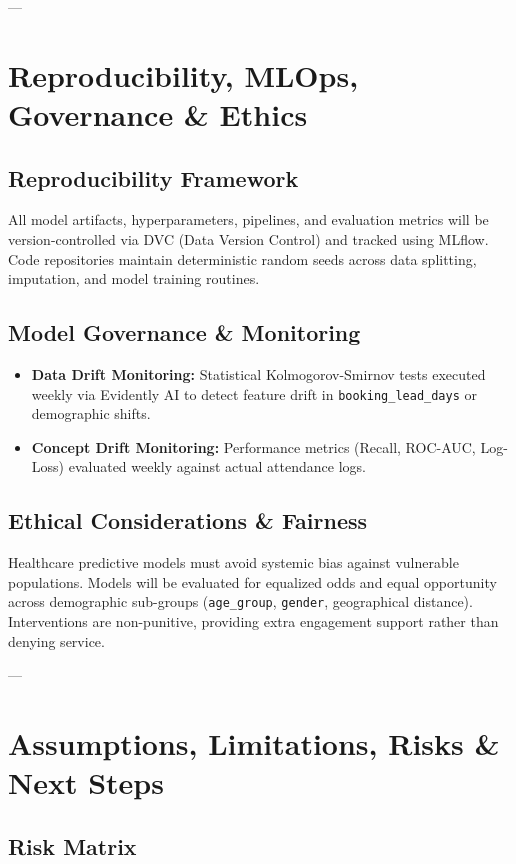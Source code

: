 \documentclass[11pt,a4paper]{article}
\begin{document}
---

\section{Reproducibility, MLOps, Governance \& Ethics}
\subsection{Reproducibility Framework}
All model artifacts, hyperparameters, pipelines, and evaluation metrics will be version-controlled via DVC (Data Version Control) and tracked using MLflow. Code repositories maintain deterministic random seeds across data splitting, imputation, and model training routines.

\subsection{Model Governance \& Monitoring}
\begin{itemize}
    \item \textbf{Data Drift Monitoring:} Statistical Kolmogorov-Smirnov tests executed weekly via Evidently AI to detect feature drift in \texttt{booking\_lead\_days} or demographic shifts.
    \item \textbf{Concept Drift Monitoring:} Performance metrics (Recall, ROC-AUC, Log-Loss) evaluated weekly against actual attendance logs.
\end{itemize}

\subsection{Ethical Considerations \& Fairness}
Healthcare predictive models must avoid systemic bias against vulnerable populations. Models will be evaluated for equalized odds and equal opportunity across demographic sub-groups (\texttt{age\_group}, \texttt{gender}, geographical distance). Interventions are non-punitive, providing extra engagement support rather than denying service.

---

\section{Assumptions, Limitations, Risks \& Next Steps}
\subsection{Risk Matrix}
\end{document}
